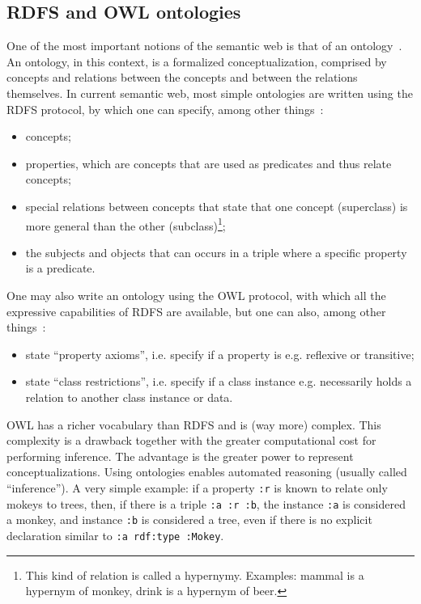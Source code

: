 \documentclass[data,datadescriptor,submit,moreauthors,pdftex]{Definitions/mdpi}
\newcommand{\te}[1] {\texttt{\footnotesize#1}}
\begin{document}
\subsection{RDFS and OWL ontologies}\label{sont}
One of the most important notions of the semantic web is that of an ontology~\cite{ont}.
An ontology, in this context, is a formalized conceptualization, comprised by
concepts and relations between the concepts and between the relations themselves.
In current semantic web, most simple ontologies are written using the RDFS protocol,
by which one can specify, among other things~\cite{rdfs}:
\begin{itemize}
  \item concepts;
  \item properties, which are concepts that are used as predicates and thus relate concepts;
  \item special relations between concepts that state that one concept (superclass) is more general than the other (subclass)\footnote{This
          kind of relation is called a hypernymy. Examples: mammal is a hypernym of monkey, drink is a hypernym of beer.};
  \item the subjects and objects that can occurs in a triple where a specific property is a predicate.
\end{itemize}

One may also write an ontology using the OWL protocol,
with which all the expressive capabilities of RDFS are
available, but one can also, among other things~\cite{ont}:
\begin{itemize}
  \item state ``property axioms'', i.e. specify if a property is e.g. reflexive or transitive;
  \item state ``class restrictions'', i.e. specify if a class instance e.g. necessarily holds a relation to another class instance or data.
\end{itemize}
OWL has a richer vocabulary than RDFS and is (way more) complex.
This complexity is a drawback together with the greater computational cost
for performing inference.
The advantage is the greater power to represent conceptualizations.
Using ontologies enables automated reasoning (usually called ``inference'').
A very simple example: if a property \te{:r} is known to relate only mokeys to trees,
then, if there is a triple \te{:a :r :b}, the instance \te{:a} is considered a monkey,
and instance \te{:b} is considered a tree,
even if there is no explicit declaration similar
to \te{:a rdf:type :Mokey}.
\end{document}
